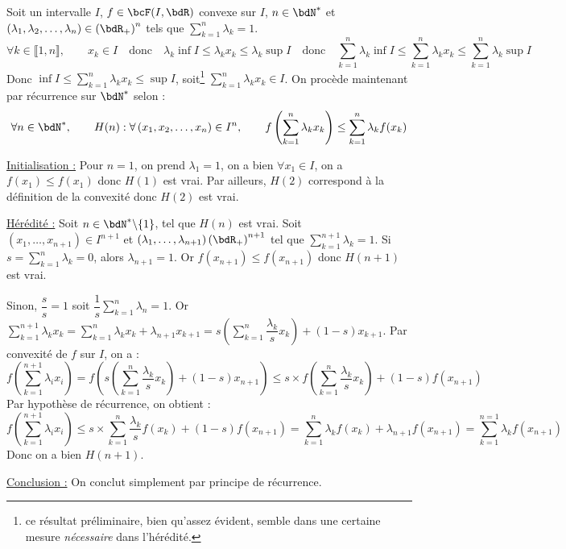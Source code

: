 \documentclass[a4paper,french,bookmarks]{article}
\begin{document}
\begin{nproof}
    Soit un intervalle $I$, $f \in \bcF(I, \bdR)$ convexe sur $I$, $n \in \bdN^*$ et $\left(\lambda_1, \lambda_2, \dots, \lambda_n\right) \in \left(\bdR_+\right)^n$ tels que $\displaystyle \sum_{k=1}^n \lambda_k = 1$.
    \[\forall k \in \llbracket 1, n\rrbracket,\qquad x_k \in I \quad \text{donc} \quad \lambda_k\inf I \leq \lambda_kx_k \leq \lambda_k \sup I \quad \text{donc} \quad \sum_{k=1}^n \lambda_k \inf I \leq \sum_{k=1}^n \lambda_kx_k \leq \sum_{k=1}^n \lambda_k \sup I\]
    Donc $\displaystyle \inf I \leq \sum_{k=1}^n \lambda_kx_k \leq \sup I$, soit\footnote{ce résultat préliminaire, bien qu'assez évident, semble dans une certaine mesure \textit{nécessaire} dans l'hérédité.} $\displaystyle \sum_{k=1}^n \lambda_kx_k \in I$. On procède maintenant par récurrence sur $\bdN^*$ selon :
    \[ \forall n \in \bdN^*,\qquad H(n) : \forall \left(x_1, x_2, \dots, x_n\right) \in I^n,\qquad f\left(\sum_{k=1}^n \lambda_kx_k\right) \leq \sum_{k=1}^n \lambda_kf(x_k)\]
    \begin{enumerate}
        \itt \underline{Initialisation :} Pour $n=1$, on prend $\lambda_1 = 1$, on a bien $\forall x_1 \in I$, on a $f(x_1) \leq f(x_1)$ donc $H(1)$ est vrai. Par ailleurs, $H(2)$ correspond à la définition de la convexité donc $H(2)$ est vrai.
            
        \itt \underline{Hérédité :} Soit $n \in \bdN^* \backslash \{ 1 \}$, tel que $H(n)$ est vrai. Soit $\left(x_1, \dots, x_{n+1}\right) \in I^{n+1}$ et $\left(\lambda_1, \dots, \lambda_{n+1}\right) \left(\bdR_+\right)^{n+1}$ tel que $\displaystyle\sum_{k=1}^{n+1} \lambda_k = 1$. Si $s = \displaystyle\sum_{k=1}^n \lambda_k = 0$, alors $\lambda_{n+1} = 1$. Or  $f(x_{n+1}) \leq f(x_{n+1})$ donc $H(n+1)$ est vrai.
            
        Sinon, $\dfrac{s}{s} = 1$ soit $\dfrac{1}{s}\displaystyle\sum_{k=1}^n \lambda_n = 1$. Or $\displaystyle \sum_{k=1}^{n+1} \lambda_kx_k = \sum_{k=1}^{n} \lambda_kx_k + \lambda_{n+1}x_{k+1} = s\left(\sum_{k=1}^{n} \dfrac{\lambda_k}{s}x_k\right) + (1-s)x_{k+1}$. Par convexité de $f$ sur $I$, on a :
        \[ f\left(\sum_{k=1}^{n+1} \lambda_ix_i\right) = f\left( s\left(\sum_{k=1}^{n} \dfrac{\lambda_k}{s}x_k\right) + (1-s)x_{n+1}\right) \leq s\times f\left(\sum_{k=1}^n \dfrac{\lambda_k}{s}x_k\right) + (1-s)f(x_{n+1})\]
        Par hypothèse de récurrence, on obtient :
        \[ f\left(\sum_{k=1}^{n+1} \lambda_ix_i\right) \leq s\times \sum_{k=1}^n \dfrac{\lambda_k}{s}f\left(x_k\right) + (1-s)f(x_{n+1}) = \sum_{k=1}^n \lambda_kf(x_k) + \lambda_{n+1}f(x_{n+1}) = \sum_{k=1}^{n=1}\lambda_kf(x_{n+1})\]
        Donc on a bien $H(n+1)$.
            
        \itt \underline{Conclusion :} On conclut simplement par principe de récurrence.
    \end{enumerate}
\end{nproof}
\end{document}
